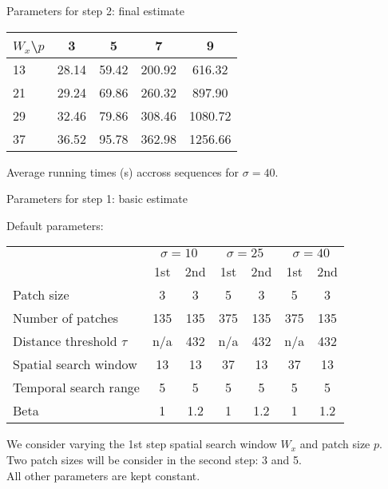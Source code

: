 \documentclass[mathserif, 8pt]{beamer}
\makeatletter
\newcounter{multipleslide}
\newcommand{\restoreframe}{%
\patchcmd{\beamer@@tmpl@footline}%
	{\themultipleslide}%
	{\insertframenumber}%
	{}%
	{}%
\setcounter{framenumber}{\value{multipleslide}}%
}
\makeatother
\begin{document}
\begin{frame}{Parameters for step 2: final estimate}
	\begin{center}
		\begin{tabular}{l | c c c c }
			 $W_x$\textbackslash $p$ & 3  & 5  & 7  & 9 \\\hline\hline
			 13 & 28.14 &  59.42 & 200.92 & 616.32  \\
			 21 & 29.24 &  69.86 & 260.32 & 897.90  \\
			 29 & 32.46 &  79.86 & 308.46 & 1080.72 \\
			 37 & 36.52 &  95.78 & 362.98 & 1256.66 \\
		\end{tabular}

		\bigskip

		Average running times (s) accross sequences for $\sigma = 40$.
	\end{center}
\end{frame}
\restoreframe


\begin{frame}{Parameters for step 1: basic estimate}
	\begin{center}

	Default parameters:

	\bigskip

	\begin{tabular}{l | c c | c c | c c }
		& \multicolumn{2}{c|}{$\sigma = 10$} 
		& \multicolumn{2}{c|}{$\sigma = 25$} 
		& \multicolumn{2}{c}{$\sigma = 40$} \\
		                            & 1st  & 2nd  & 1st  & 2nd  & 1st  & 2nd \\\hline\hline
		Patch size                  &  3   &   3  &  5   &   3  &  5   &   3 \\
		Number of patches           & 135  & 135  & 375  & 135  & 375  & 135 \\
		Distance threshold $\tau$   & n/a  & 432  & n/a  & 432  & n/a  & 432 \\
		Spatial search window       & 13   & 13   & 37   & 13   & 37   & 13  \\
		Temporal search range       & 5    & 5    & 5    & 5    & 5    & 5   \\\hline
		Beta                        & 1    & 1.2  & 1    & 1.2  & 1    & 1.2 \\\hline
	\end{tabular}

	\bigskip
	\bigskip
	\bigskip

	We consider varying the 1st step spatial search window $W_x$ and patch size $p$.\\
	Two patch sizes will be consider in the second step: 3 and 5.\\
	All other parameters are kept constant.

	\end{center}
\end{frame}
\end{document}
